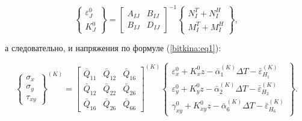 \begin{equation}

\label{bitkina:eq11}

\left\{ \begin{array}{c}

\varepsilon _J^0    \\

K_J^0

\end{array} \right\} = \begin{bmatrix}

A_{I\!J}    & B_{I\!J}    \\

B_{I\!J}    & D_{I\!J}

\end{bmatrix}^{-1} \left\{\begin{array}{c}

N_I^T + N_I^H    \\

M_I^T + M_I^H

\end{array} \right\},

\end{equation}

а следовательно, и напряжения по формуле (\ref{bitkina:eq1}):

\begin{equation}

\label{bitkina:eq12}

\left\{ \begin{array}{c}

\sigma_x \\

\sigma_y \\

\tau_{xy}

\end{array} \right\}^{(K)}=\begin{bmatrix}

\bar {Q}_{11}    & \bar {Q}_{12}    & \bar {Q}_{16} \\

\bar {Q}_{12}    & \bar {Q}_{22}    & \bar {Q}_{26} \\

\bar {Q}_{16}    & \bar {Q}_{26}    & \bar {Q}_{66}

\end{bmatrix}^{(K)} \left\{ \begin{array}{c}

\varepsilon_x^0 + K_x^0 z - \bar {\alpha }_1^{(K)} \Delta T-\bar {\varepsilon}_{H_1 }^{(K)} \\

\varepsilon _y^0 + K_y^0 z-\bar {\alpha }_2^{(K)} \Delta T-\bar {\varepsilon}_{H_2 }^{(K)} \\

\gamma _{xy}^0 +K_{xy}^0 z-\bar {\alpha }_6^{(K)} \Delta T-\bar {\varepsilon }_{H_6 }^{(K)}

\end{array} \right\}.

\end{equation}

